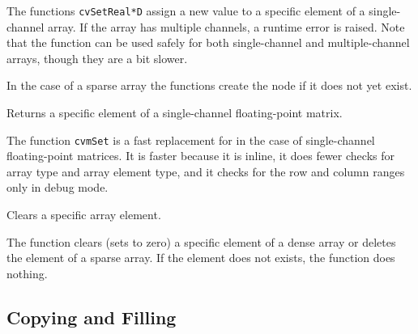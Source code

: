 The functions \texttt{cvSetReal*D} assign a new value to a specific
element of a single-channel array. If the array has multiple channels,
a runtime error is raised. Note that the  function can be used
safely for both single-channel and multiple-channel arrays, though they
are a bit slower.

In the case of a sparse array the functions create the node if it does not yet exist.

\label{mSet}

Returns a specific element of a single-channel floating-point matrix.


\begin{description}
\end{description}


The function \texttt{cvmSet} is a fast replacement for 
in the case of single-channel floating-point matrices. It is faster because
it is inline, it does fewer checks for array type and array element type, 
and it checks for the row and column ranges only in debug mode.

\label{ClearND}

Clears a specific array element.


\begin{description}
\end{description}


The function  clears (sets to zero) a specific element of a dense array or deletes the element of a sparse array. If the element does not exists, the function does nothing.


\subsection{Copying and Filling}


\label{Copy}

